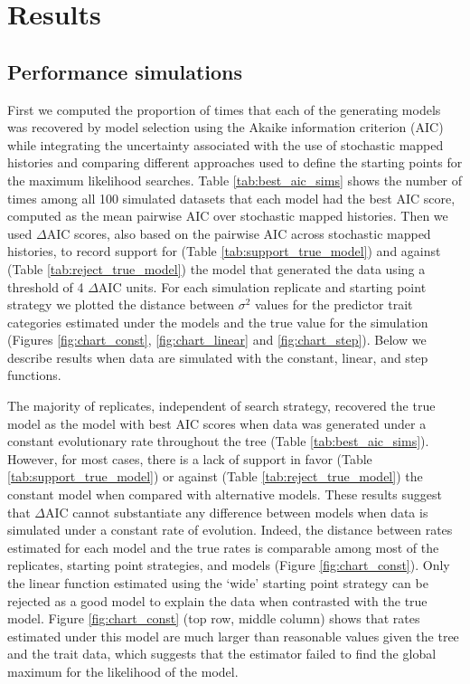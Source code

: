 \section{Results}

\subsection{Performance simulations}

First we computed the proportion of times that each of the generating models was recovered by model selection using the Akaike information criterion (AIC) while integrating the uncertainty associated with the use of stochastic mapped histories and comparing different approaches used to define the starting points for the maximum likelihood searches. Table \ref{tab:best_aic_sims} shows the number of times among all 100 simulated datasets that each model had the best AIC score, computed as the mean pairwise AIC over stochastic mapped histories. Then we used $\Delta$AIC scores, also based on the pairwise AIC across stochastic mapped histories, to record support for (Table \ref{tab:support_true_model}) and against (Table \ref{tab:reject_true_model}) the model that generated the data using a threshold of 4 $\Delta$AIC units. For each simulation replicate and starting point strategy we plotted the distance between $\sigma^{2}$ values for the predictor trait categories estimated under the models and the true value for the simulation (Figures \ref{fig:chart_const}, \ref{fig:chart_linear} and \ref{fig:chart_step}). Below we describe results when data are simulated with the constant, linear, and step functions.

The majority of replicates, independent of search strategy, recovered the true model as the model with best AIC scores when data was generated under a constant evolutionary rate throughout the tree (Table \ref{tab:best_aic_sims}). However, for most cases, there is a lack of support in favor (Table \ref{tab:support_true_model}) or against (Table \ref{tab:reject_true_model}) the constant model when compared with alternative models. These results suggest that $\Delta$AIC cannot substantiate any difference between models when data is simulated under a constant rate of evolution. Indeed, the distance between rates estimated for each model and the true rates is comparable among most of the replicates, starting point strategies, and models (Figure \ref{fig:chart_const}). Only the linear function estimated using the `wide' starting point strategy can be rejected as a good model to explain the data when contrasted with the true model. Figure \ref{fig:chart_const} (top row, middle column) shows that rates estimated under this model are much larger than reasonable values given the tree and the trait data, which suggests that the estimator failed to find the global maximum for the likelihood of the model.

